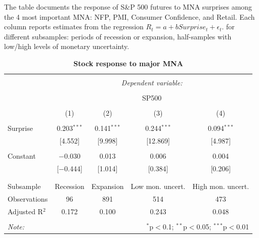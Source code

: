 \documentclass[12pt]{article}
\begin{document}
\begin{table}[!htbp] \centering 
  \caption{\textbf{Stock response to major MNA}} 
  \label{} 
  \begin{flushleft}
    {\medskip\small
 The table documents the response of S\&P 500 futures to MNA surprises among the 4 most important MNA: NFP, PMI, Consumer Confidence, and Retail. Each column reports estimates from the regression $R_t = a + b Surprise_t + \epsilon_t.$ for different subsamples: periods of recession or expansion, half-samples with low/high levels of monetary uncertainty.}
    \medskip
    \end{flushleft}
\begin{tabular}{@{\extracolsep{5pt}}lcccc} 
\\[-1.8ex]\hline 
\hline \\[-1.8ex] 
 & \multicolumn{4}{c}{\textit{Dependent variable:}} \\ 
\cline{2-5} 
\\[-1.8ex] & \multicolumn{4}{c}{SP500} \\ 
\\[-1.8ex] & (1) & (2) & (3) & (4)\\ 
\hline \\[-1.8ex] 
 Surprise & 0.203$^{***}$ & 0.141$^{***}$ & 0.244$^{***}$ & 0.094$^{***}$ \\ 
  & [4.552] & [9.998] & [12.869] & [4.987] \\ 
  & & & & \\ 
 Constant & $-$0.030 & 0.013 & 0.006 & 0.004 \\ 
  & [$-$0.444] & [1.014] & [0.384] & [0.206] \\ 
  & & & & \\ 
\hline \\[-1.8ex] 
Subsample & Recession & Expansion & Low mon. uncert. & High mon. uncert. \\ 
Observations & 96 & 891 & 514 & 473 \\ 
Adjusted R$^{2}$ & 0.172 & 0.100 & 0.243 & 0.048 \\ 
\hline 
\hline \\[-1.8ex] 
\textit{Note:}  & \multicolumn{4}{r}{$^{*}$p$<$0.1; $^{**}$p$<$0.05; $^{***}$p$<$0.01} \\ 
\end{tabular} 
\end{table}
\end{document}
